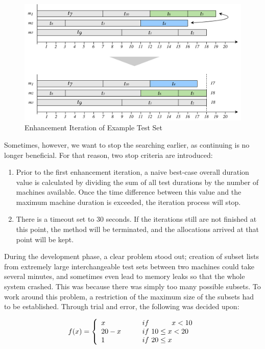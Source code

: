 \begin{figure}[t]
    \centering
    \includegraphics[width=\textwidth]{figures/new/iteration2.pdf}
    \caption{Enhancement Iteration of Example Test Set}
    \label{fig.iteration}
\end{figure}

Sometimes, however, we want to stop the searching earlier, as continuing is no longer beneficial. For that reason, two stop criteria are introduced:

\begin{enumerate}
    \item Prior to the first enhancement iteration, a naive best-case overall duration value is calculated by dividing the sum of all test durations by the number of machines available. Once the time difference between this value and the maximum machine duration is exceeded, the iteration process will stop.
    \item There is a timeout set to 30 seconds. If the iterations still are not finished at this point, the method will be terminated, and the allocations arrived at that point will be kept.
\end{enumerate}

During the development phase, a clear problem stood out; creation of subset lists from extremely large interchangeable test sets between two machines could take several minutes, and sometimes even lead to memory leaks so that the whole system crashed. This was because there was simply too many possible subsets. To work around this problem, a restriction of the maximum size of the subsets had to be established. Through trial and error, the following was decided upon:

\[
\hfill
    f(x)=\left\{
        \begin{array}{l l}
          x         &   \hspace{20px} if \hspace{32px} x < 10\\
          20-x      &   \hspace{20px} if \ 10 \leq x < 20 \\
          1         &   \hspace{20px} if \ 20 \leq x
        \end{array}
    \right.
\hfill
\]

